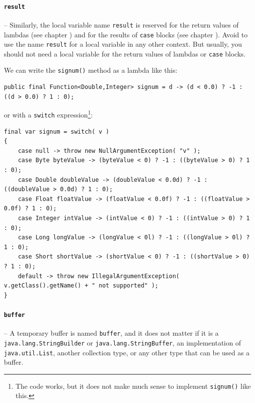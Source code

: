 \paragraph{\lstinline|result|}\label{lbl:Result}– Similarly, the local variable name \lstinline|result| is reserved for the return values of lambdas (see chapter ) and for the results of \lstinline|case| blocks (see chapter ). Avoid to use the name \lstinline|result| for a local variable in any other context. But usually, you should not need a local variable for the return values of lambdas or \lstinline|case| blocks.

We can write the \lstinline|signum()| method as a lambda like this:
\begin{lstlisting}
public final Function<Double,Integer> signum = d -> (d < 0.0) ? -1 : ((d > 0.0) ? 1 : 0);
\end{lstlisting}

or with a \lstinline|switch| expression\footnote{The code works, but it does not make much sense to implement \lstinline|signum()| like this.}:
\begin{lstlisting}
final var signum = switch( v )
{
    case null -> throw new NullArgumentException( "v" );
    case Byte byteValue -> (byteValue < 0) ? -1 : ((byteValue > 0) ? 1 : 0);
    case Double doubleValue -> (doubleValue < 0.0d) ? -1 : ((doubleValue > 0.0d) ? 1 : 0);
    case Float floatValue -> (floatValue < 0.0f) ? -1 : ((floatValue > 0.0f) ? 1 : 0);
    case Integer intValue -> (intValue < 0) ? -1 : ((intValue > 0) ? 1 : 0);
    case Long longValue -> (longValue < 0l) ? -1 : ((longValue > 0l) ? 1 : 0);
    case Short shortValue -> (shortValue < 0) ? -1 : ((shortValue > 0) ? 1 : 0);
    default -> throw new IllegalArgumentException( v.getClass().getName() + " not supported" );
}
\end{lstlisting}

\paragraph{\lstinline|buffer|}– A temporary buffer is named \lstinline|buffer|, and it does not matter if it is a \lstinline|java.lang.StringBuilder| or \lstinline|java.lang.StringBuffer|, an implementation of \lstinline|java.util.List|, another collection type, or any other type that can be used as a buffer.

